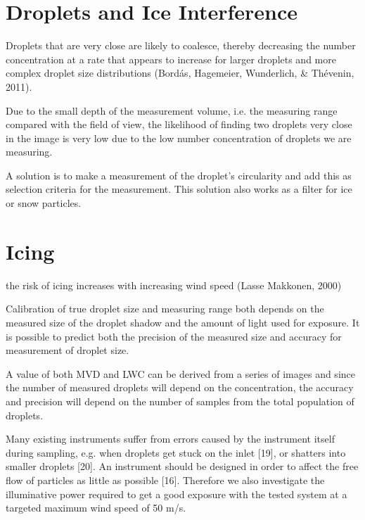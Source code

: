 

\section{Droplets and Ice Interference}

Droplets that are very close are likely to coalesce, thereby decreasing the number concentration at a rate that appears to increase for larger droplets and more complex droplet size distributions (Bordás, Hagemeier, Wunderlich, \& Thévenin, 2011). 

Due to the small depth of the measurement volume, i.e. the measuring range compared with the field of view, the likelihood of finding two droplets very close in the image is very low due to the low number concentration of droplets we are measuring.

A solution is to make a measurement of the droplet’s circularity and add this as selection criteria for the measurement. This solution also works as a filter for ice or snow particles. 

\section{Icing}

the risk of icing increases with increasing wind speed (Lasse Makkonen, 2000)



Calibration of true droplet size and measuring range both depends on the measured size of the droplet shadow and the amount of light used for exposure. It is possible to predict both the precision of the measured size and accuracy for measurement of droplet size. 

A value of both MVD and LWC can be derived from a series of images and since the number of measured droplets will depend on the concentration, the accuracy and precision will depend on the number of samples from the total population of droplets. 

Many existing instruments suffer from errors caused by the instrument itself during sampling, e.g. when droplets get stuck on the inlet [19], or shatters into smaller droplets [20]. An instrument should be designed in order to affect the free flow of particles as little as possible [16]. Therefore we also investigate the illuminative power required to get a good exposure with the tested system at a targeted maximum wind speed of 50 m/s.


